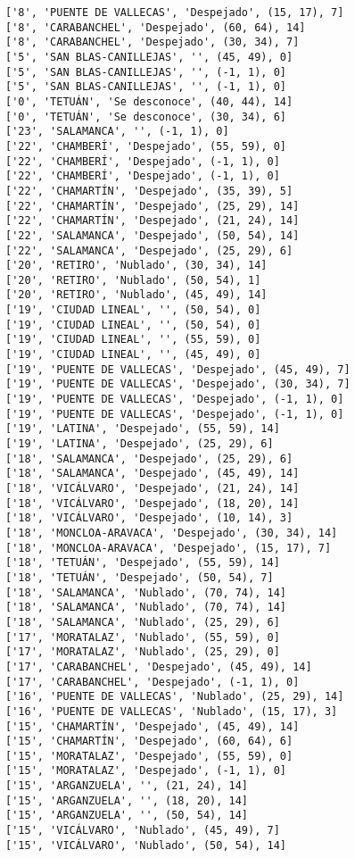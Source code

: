 \documentclass[11pt]{article}
\begin{document}
\begin{Verbatim}[commandchars=\\\{\}]
['8', 'PUENTE DE VALLECAS', 'Despejado', (15, 17), 7]
['8', 'CARABANCHEL', 'Despejado', (60, 64), 14]
['8', 'CARABANCHEL', 'Despejado', (30, 34), 7]
['5', 'SAN BLAS-CANILLEJAS', '', (45, 49), 0]
['5', 'SAN BLAS-CANILLEJAS', '', (-1, 1), 0]
['5', 'SAN BLAS-CANILLEJAS', '', (-1, 1), 0]
['0', 'TETUÁN', 'Se desconoce', (40, 44), 14]
['0', 'TETUÁN', 'Se desconoce', (30, 34), 6]
['23', 'SALAMANCA', '', (-1, 1), 0]
['22', 'CHAMBERÍ', 'Despejado', (55, 59), 0]
['22', 'CHAMBERÍ', 'Despejado', (-1, 1), 0]
['22', 'CHAMBERÍ', 'Despejado', (-1, 1), 0]
['22', 'CHAMARTÍN', 'Despejado', (35, 39), 5]
['22', 'CHAMARTÍN', 'Despejado', (25, 29), 14]
['22', 'CHAMARTÍN', 'Despejado', (21, 24), 14]
['22', 'SALAMANCA', 'Despejado', (50, 54), 14]
['22', 'SALAMANCA', 'Despejado', (25, 29), 6]
['20', 'RETIRO', 'Nublado', (30, 34), 14]
['20', 'RETIRO', 'Nublado', (50, 54), 1]
['20', 'RETIRO', 'Nublado', (45, 49), 14]
['19', 'CIUDAD LINEAL', '', (50, 54), 0]
['19', 'CIUDAD LINEAL', '', (50, 54), 0]
['19', 'CIUDAD LINEAL', '', (55, 59), 0]
['19', 'CIUDAD LINEAL', '', (45, 49), 0]
['19', 'PUENTE DE VALLECAS', 'Despejado', (45, 49), 7]
['19', 'PUENTE DE VALLECAS', 'Despejado', (30, 34), 7]
['19', 'PUENTE DE VALLECAS', 'Despejado', (-1, 1), 0]
['19', 'PUENTE DE VALLECAS', 'Despejado', (-1, 1), 0]
['19', 'LATINA', 'Despejado', (55, 59), 14]
['19', 'LATINA', 'Despejado', (25, 29), 6]
['18', 'SALAMANCA', 'Despejado', (25, 29), 6]
['18', 'SALAMANCA', 'Despejado', (45, 49), 14]
['18', 'VICÁLVARO', 'Despejado', (21, 24), 14]
['18', 'VICÁLVARO', 'Despejado', (18, 20), 14]
['18', 'VICÁLVARO', 'Despejado', (10, 14), 3]
['18', 'MONCLOA-ARAVACA', 'Despejado', (30, 34), 14]
['18', 'MONCLOA-ARAVACA', 'Despejado', (15, 17), 7]
['18', 'TETUÁN', 'Despejado', (55, 59), 14]
['18', 'TETUÁN', 'Despejado', (50, 54), 7]
['18', 'SALAMANCA', 'Nublado', (70, 74), 14]
['18', 'SALAMANCA', 'Nublado', (70, 74), 14]
['18', 'SALAMANCA', 'Nublado', (25, 29), 6]
['17', 'MORATALAZ', 'Nublado', (55, 59), 0]
['17', 'MORATALAZ', 'Nublado', (25, 29), 0]
['17', 'CARABANCHEL', 'Despejado', (45, 49), 14]
['17', 'CARABANCHEL', 'Despejado', (-1, 1), 0]
['16', 'PUENTE DE VALLECAS', 'Nublado', (25, 29), 14]
['16', 'PUENTE DE VALLECAS', 'Nublado', (15, 17), 3]
['15', 'CHAMARTÍN', 'Despejado', (45, 49), 14]
['15', 'CHAMARTÍN', 'Despejado', (60, 64), 6]
['15', 'MORATALAZ', 'Despejado', (55, 59), 0]
['15', 'MORATALAZ', 'Despejado', (-1, 1), 0]
['15', 'ARGANZUELA', '', (21, 24), 14]
['15', 'ARGANZUELA', '', (18, 20), 14]
['15', 'ARGANZUELA', '', (50, 54), 14]
['15', 'VICÁLVARO', 'Nublado', (45, 49), 7]
['15', 'VICÁLVARO', 'Nublado', (50, 54), 14]

\end{Verbatim}
\end{document}
